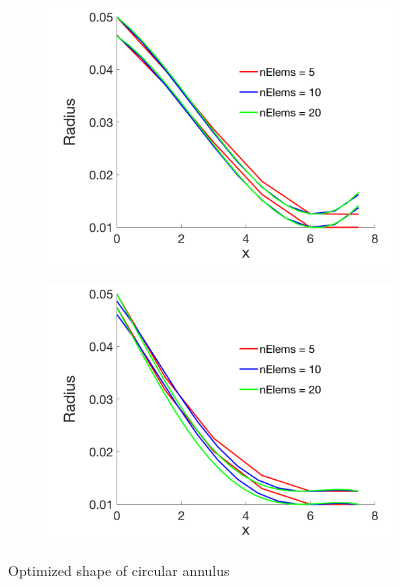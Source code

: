 \documentclass[a4paper]{article}
\begin{document}
\begin{figure} [H]
\begin{subfigure}{0.45\textwidth}
    \includegraphics[width=1.0\linewidth]{p3.png}
    \label{fig:cubic}
  \end{subfigure}
  \begin{subfigure}{0.45\textwidth}
    \centering
    \includegraphics[width=1.0\linewidth]{p4.png}
    \label{fig:quatic}
  \end{subfigure}  
  \caption{Optimized shape of circular annulus  \label{fig:final_shape}}
\end{figure}
\end{document}
